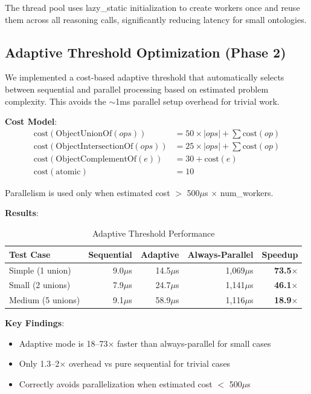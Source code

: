\documentclass[preprint,12pt]{elsarticle}
\begin{document}
The thread pool uses lazy\_static initialization to create workers once and reuse them across all reasoning calls, significantly reducing latency for small ontologies.

\subsection{Adaptive Threshold Optimization (Phase 2)}
\label{sec:adaptive-opt}

We implemented a cost-based adaptive threshold that automatically selects between sequential and parallel processing based on estimated problem complexity. This avoids the $\sim$1ms parallel setup overhead for trivial work.

\textbf{Cost Model}:
\begin{align}
    \text{cost}(\text{ObjectUnionOf}(ops)) &= 50 \times |ops| + \sum \text{cost}(op) \\
    \text{cost}(\text{ObjectIntersectionOf}(ops)) &= 25 \times |ops| + \sum \text{cost}(op) \\
    \text{cost}(\text{ObjectComplementOf}(e)) &= 30 + \text{cost}(e) \\
    \text{cost}(\text{atomic}) &= 10
\end{align}

Parallelism is used only when estimated cost $>$ 500$\mu$s $\times$ num\_workers.

\textbf{Results}:
\begin{table}[htbp]
\centering
\caption{Adaptive Threshold Performance}
\label{tab:adaptive}
\begin{tabular}{l|r|r|r|r}
\toprule
\textbf{Test Case} & \textbf{Sequential} & \textbf{Adaptive} & \textbf{Always-Parallel} & \textbf{Speedup} \\
\midrule
Simple (1 union) & 9.0$\mu$s & 14.5$\mu$s & 1,069$\mu$s & \textbf{73.5$\times$} \\
Small (2 unions) & 7.9$\mu$s & 24.7$\mu$s & 1,141$\mu$s & \textbf{46.1$\times$} \\
Medium (5 unions) & 9.1$\mu$s & 58.9$\mu$s & 1,116$\mu$s & \textbf{18.9$\times$} \\
\bottomrule
\end{tabular}
\end{table}

\textbf{Key Findings}:
\begin{itemize}
    \item Adaptive mode is 18--73$\times$ faster than always-parallel for small cases
    \item Only 1.3--2$\times$ overhead vs pure sequential for trivial cases
    \item Correctly avoids parallelization when estimated cost $<$ 500$\mu$s
\end{itemize}
\end{document}

